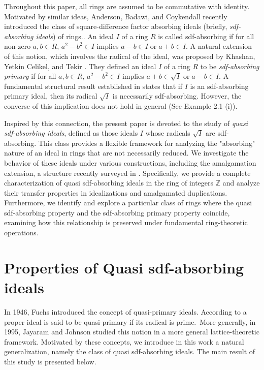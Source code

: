\documentclass{amsart}%
\begin{document}
Throughout this paper, all rings are assumed to be commutative with identity.
Motivated by similar ideas, Anderson, Badawi, and Coykendall \cite{AB2024}
recently introduced the class of square-difference factor absorbing ideals
(briefly, \emph{sdf-absorbing ideals}) of rings.. An ideal $I$ of a ring $R$
is called sdf-absorbing if for all non-zero $a,b\in R$, $a^{2}-b^{2}\in I$
implies $a-b\in I\;\text{or}\;a+b\in I.$ A natural extension of this notion,
which involves the radical of the ideal, was proposed by Khashan, Yetkin
Celikel, and Tekir \cite{KhashanCelikel}. They defined an ideal $I$ of a ring
$R$ to be \emph{sdf-absorbing primary} if for all $a,b\in R$, $a^{2}-b^{2}\in
I$ implies $a+b\in\sqrt{I}\;\text{or}\;a-b\in I.$ A fundamental structural
result established in \cite{KhashanCelikel} states that if $I$ is an
sdf-absorbing primary ideal, then its radical $\sqrt{I}$ is necessarily
sdf-absorbing. However, the converse of this implication does not hold in
general (See Example 2.1 (i)).

Inspired by this connection, the present paper is devoted to the study of
\emph{quasi sdf-absorbing ideals}, defined as those ideals $I$ whose radicals
$\sqrt{I}$ are sdf-absorbing. This class provides a flexible framework for
analyzing the "absorbing" nature of an ideal in rings that are not necessarily
reduced. We investigate the behavior of these ideals under various
constructions, including the amalgamation extension, a structure recently
surveyed in \cite{ElKhalfi-Kim-Mahdou}. Specifically, we provide a complete
characterization of quasi sdf-absorbing ideals in the ring of integers
$\mathbb{Z}$ and analyze their transfer properties in idealizations and
amalgamated duplications. Furthermore, we identify and explore a particular
class of rings where the quasi sdf-absorbing property and the sdf-absorbing
primary property coincide, examining how this relationship is preserved under
fundamental ring-theoretic operations.

\section{Properties of Quasi sdf-absorbing ideals}

In 1946, Fuchs introduced the concept of quasi-primary ideals. According to
\cite{F} a proper ideal is said to be quasi-primary if its radical is
prime.\ More generally, in 1995, Jayaram and Johnson \cite{J} studied this
notion in a more general lattice-theoretic framework. Motivated by these
concepts, we introduce in this work a natural generalization, namely the class
of quasi sdf-absorbing ideals. The main result of this study is presented below.
\end{document}
